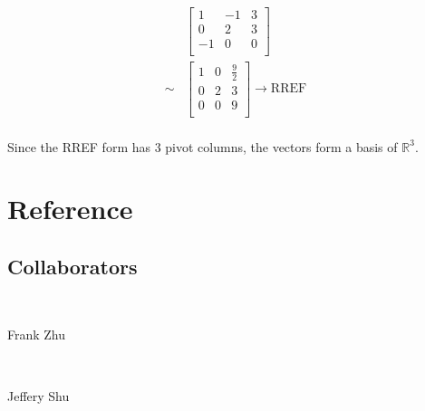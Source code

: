 \documentclass{article}
\def\R{\mathbb{R}}
\begin{document}
\begin{equation}
\tag{5.3-2}
\begin{split}
&\begin{bmatrix}
1&-1&3\\
0&2&3\\
-1&0&0\\
\end{bmatrix}\\
\sim &\begin{bmatrix}
1&0&\frac{9}{2}\\
0&2&3\\
0&0&9\\
\end{bmatrix} \rightarrow \text{RREF}\\
\end{split}
\end{equation}

Since the RREF form has 3 pivot columns, the vectors form a basis of $\R^3$.

\newpage

\section{Reference}

\subsection{Collaborators}

~

Frank Zhu

~

Jeffery Shu
\end{document}

